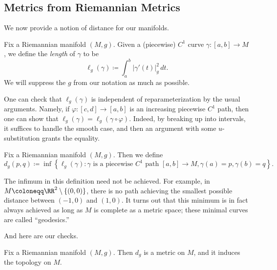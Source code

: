 \documentclass[../notes.tex]{subfiles}
\begin{document}
\subsection{Metrics from Riemannian Metrics}
We now provide a notion of distance for our manifolds.
\begin{definition}[length]
	Fix a Riemannian manifold $(M,g)$. Given a (piecewise) $C^1$ curve $\gamma\colon[a,b]\to M$, we define the \textit{length} of $\gamma$ to be
	\[\ell_g(\gamma)\coloneqq\int_a^b\left|\gamma'(t)\right|_g^2\,dt.\]
	We will suppress the $g$ from our notation as much as possible.
\end{definition}
\begin{remark}
	One can check that $\ell_g(\gamma)$ is independent of reparameterization by the usual arguments. Namely, if $\varphi\colon[c,d]\to[a,b]$ is an increasing piecewise $C^1$ path, then one can show that $\ell_g(\gamma)=\ell_g(\gamma\circ\varphi)$. Indeed, by breaking up into intervals, it suffices to handle the smooth case, and then an argument with some $u$-substitution grants the equality.
\end{remark}
\begin{definition}
	Fix a Riemannian manifold $(M,g)$. Then we define
	\[d_g(p,q)\coloneqq\inf\left\{\ell_g(\gamma):\gamma\text{ is a piecewise $C^1$ path }[a,b]\to M,\gamma(a)=p,\gamma(b)=q\right\}.\]
\end{definition}
\begin{remark}
	The infimum in this definition need not be achieved. For example, in $M\coloneqq\RR^2\setminus\{(0,0)\}$, there is no path achieving the smallest possible distance between $(-1,0)$ and $(1,0)$. It turns out that this minimum is in fact always achieved as long as $M$ is complete as a metric space; these minimal curves are called ``geodesics.''
\end{remark}
And here are our checks.
\begin{theorem}
	Fix a Riemannian manifold $(M,g)$. Then $d_g$ is a metric on $M$, and it induces the topology on $M$.
\end{theorem}
\end{document}
